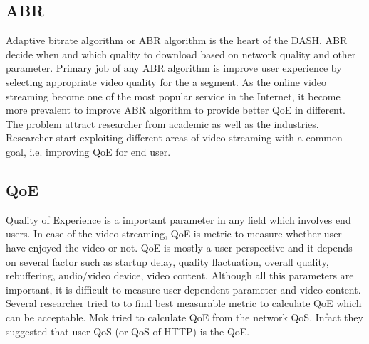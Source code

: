 \subsection{ABR}
Adaptive bitrate algorithm or ABR algorithm is the heart of the DASH. ABR decide when and which quality to download based on network quality and other parameter. Primary job of any ABR algorithm is improve user experience by selecting appropriate video quality for the a segment. As the online video streaming become one of the most popular service in the Internet, it become more prevalent to improve ABR algorithm to provide better QoE in different. The problem attract researcher from academic as well as the industries. Researcher start exploiting different areas of video streaming with a common goal, i.e. improving QoE for end user.

\subsection{QoE}
Quality of Experience is a important parameter in any field which involves end users. In case of the video streaming, QoE is metric to measure whether user have enjoyed the video or not. QoE is mostly a user perspective and it depends on several factor such as startup delay, quality flactuation, overall quality, rebuffering, audio/video device, video content. Although all this parameters are important, it is difficult to measure user dependent parameter and video content. Several researcher tried to to find best measurable metric to calculate QoE which can be acceptable. Mok \etal \cite{5990550} tried to calculate QoE from the network QoS. Infact they suggested that user QoS (or QoS of HTTP) is the QoE. 
